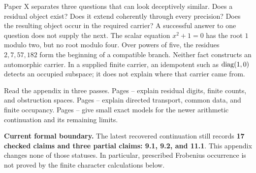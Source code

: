 Paper X separates three questions that can look deceptively similar. Does a residual object exist? Does it extend coherently through every precision? Does the resulting object occur in the required carrier? A successful answer to one question does not supply the next.
The scalar equation $x^2+1=0$ has the root $1$ modulo two, but no root modulo four. Over powers of five, the residues $2,7,57,182$ form the beginning of a compatible branch. Neither fact constructs an automorphic carrier. In a supplied finite carrier, an idempotent such as $\operatorname{diag}(1,0)$ detects an occupied subspace; it does not explain where that carrier came from.

Read the appendix in three passes. Pages -- explain residual digits, finite counts, and obstruction spaces. Pages -- explain directed transport, common data, and finite occupancy. Pages -- give small exact models for the newer arithmetic continuation and its remaining limits.
\begin{insight}
\textbf{Current formal boundary.} The latest recovered continuation still records \textbf{17 checked claims and three partial claims: 9.1, 9.2, and 11.1}. This appendix changes none of those statuses. In particular, prescribed Frobenius occurrence is not proved by the finite character calculations below.
\end{insight}

